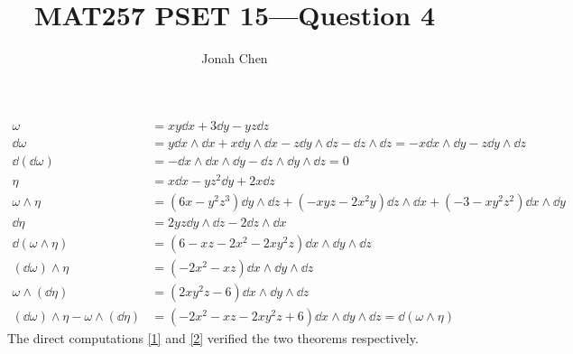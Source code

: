 \documentclass{exam}
\title{MAT257 PSET 15---Question 4}
\author{Jonah Chen}
\date{}
\begin{document}
    \sffamily
    \maketitle
    \begin{align}
        \omega&=xy\dd x+3\dd y-yz\dd z\\
        \dd\omega&=y\dd x\wedge\dd x+x\dd y\wedge\dd x-z\dd y\wedge\dd z-\dd z\wedge\dd z=-x\dd x\wedge\dd y-z\dd y\wedge\dd z\\
        \dd(\dd\omega)&=-\dd x\wedge\dd x\wedge\dd y-\dd z\wedge\dd y\wedge\dd z=0\label{1}\\
        \eta&=x\dd x-yz^2\dd y+2x\dd z\\
        \omega\wedge\eta&=(6x-y^2z^3)\dd y\wedge\dd z+(-xyz-2x^2y)\dd z\wedge\dd x+(-3-xy^2z^2)\dd x\wedge\dd y\\
        \dd\eta&=2yz\dd y\wedge\dd z-2\dd z \wedge\dd x\\
        \dd(\omega\wedge\eta)&=(6-xz-2x^2-2xy^2z)\dd x\wedge\dd y\wedge\dd z\\
        (\dd\omega)\wedge\eta&=(-2x^2-xz)\dd x\wedge\dd y\wedge\dd z\\
        \omega\wedge(\dd\eta)&=(2xy^2z-6)\dd x\wedge\dd y\wedge\dd z\\
        (\dd\omega)\wedge\eta-\omega\wedge(\dd\eta)&=(-2x^2-xz-2xy^2z+6)\dd x\wedge\dd y\wedge\dd z=\dd(\omega\wedge\eta)\label{2}
    \end{align}
    The direct computations \eqref{1} and \eqref{2} verified the two theorems respectively.
\end{document}
